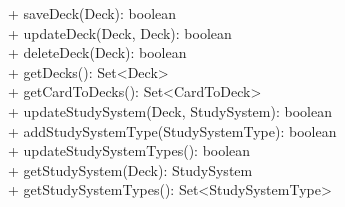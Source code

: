 { 
    + saveDeck(Deck): boolean \\
    + updateDeck(Deck, Deck): boolean \\
    + deleteDeck(Deck): boolean \\
    + getDecks(): Set<Deck> \\
    + getCardToDecks(): Set<CardToDeck> \\
    + updateStudySystem(Deck, StudySystem): boolean \\
    + addStudySystemType(StudySystemType): boolean \\
    + updateStudySystemTypes(): boolean \\
    + getStudySystem(Deck): StudySystem \\
    + getStudySystemTypes(): Set<StudySystemType> \\
}{}